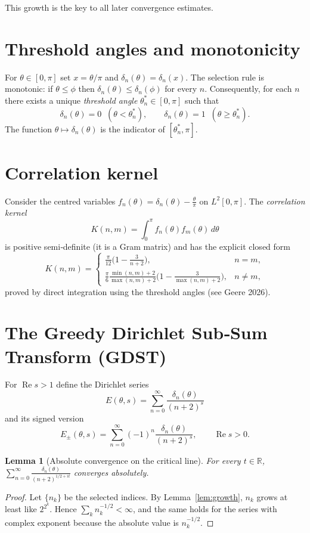 \documentclass[12pt,a4paper]{article}
\newtheorem{lemma}[theorem]{Lemma}
\theoremstyle{remark}
\begin{document}
This growth is the key to all later convergence estimates.

\section{Threshold angles and monotonicity}
\label{sec:threshold}

For $\theta\in[0,\pi]$ set $x=\theta/\pi$ and $\delta_n(\theta)=\delta_n(x)$.
The selection rule is monotonic: if $\theta\le\phi$ then $\delta_n(\theta)\le\delta_n(\phi)$ for every $n$.
Consequently, for each $n$ there exists a unique \emph{threshold angle} $\theta_n^*\in[0,\pi]$ such that
\[
\delta_n(\theta)=0\;\;(\theta<\theta_n^*),\qquad
\delta_n(\theta)=1\;\;(\theta\ge\theta_n^*).
\]
The function $\theta\mapsto\delta_n(\theta)$ is the indicator of $[\theta_n^*,\pi]$.

\section{Correlation kernel}
\label{sec:correlation}

Consider the centred variables $f_n(\theta)=\delta_n(\theta)-\frac{\theta}{\pi}$ on $L^2[0,\pi]$.
The \emph{correlation kernel}
\[
K(n,m)=\int_0^\pi f_n(\theta)f_m(\theta)\,d\theta
\]
is positive semi‑definite (it is a Gram matrix) and has the explicit closed form
\[
K(n,m)=
\begin{cases}
\frac{\pi}{12}\bigl(1-\frac{3}{n+2}\bigr), & n=m,\\[4pt]
\frac{\pi}{6}\frac{\min(n,m)+2}{\max(n,m)+2}
\bigl(1-\frac{3}{\max(n,m)+2}\bigr), & n\neq m,
\end{cases}
\]
proved by direct integration using the threshold angles (see Geere 2026).

\section{The Greedy Dirichlet Sub‑Sum Transform (GDST)}
\label{sec:GDST}

For $\operatorname{Re}s>1$ define the Dirichlet series
\[
E(\theta,s)=\sum_{n=0}^\infty \frac{\delta_n(\theta)}{(n+2)^s}
\]
and its signed version
\[
E_\pm(\theta,s)=\sum_{n=0}^\infty (-1)^n\frac{\delta_n(\theta)}{(n+2)^s},\qquad \operatorname{Re}s>0.
\]

\begin{lemma}[Absolute convergence on the critical line]\label{lem:abs_crit}
For every $t\in\mathbb R$,
$\displaystyle\sum_{n=0}^\infty\frac{\delta_n(\theta)}{(n+2)^{1/2+it}}$
converges absolutely.
\end{lemma}
\begin{proof}
Let $\{n_k\}$ be the selected indices.  By Lemma~\ref{lem:growth},
$n_k$ grows at least like $2^{2^k}$.
Hence $\sum_{k} n_k^{-1/2}<\infty$,
and the same holds for the series with complex exponent because the absolute value is $n_k^{-1/2}$.
\end{proof}
\end{document}
